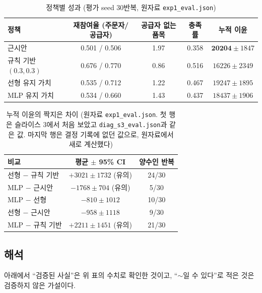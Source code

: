 \documentclass[11pt,a4paper]{article}
\begin{document}
\begin{table}[H]
\centering\small
\caption{정책별 성과 (평가 seed 30반복, 원자료 \texttt{exp1\_eval.json})}\label{tab:policy}
\begin{tabular}{lcccc}
\toprule
정책 & 재참여율 (주문자/공급자) & 공급자 없는 품목 & 충족률 & 누적 이윤\\
\midrule
근시안 & 0.501 / 0.506 & 1.97 & 0.358 & $\mathbf{20204}\pm1847$\\
규칙 기반 $(0.3,0.3)$ & 0.676 / 0.770 & 0.86 & 0.516 & $16226\pm2349$\\
선형 유지 가치 & 0.535 / 0.712 & 1.22 & 0.467 & $19247\pm1895$\\
MLP 유지 가치 & 0.534 / 0.660 & 1.43 & 0.437 & $18437\pm1906$\\
\bottomrule
\end{tabular}
\end{table}

\begin{table}[H]
\centering\small
\caption{누적 이윤의 짝지은 차이 (원자료 \texttt{exp1\_eval.json}. 첫 행은 슬라이스 3에서 처음 보았고 \texttt{diag\_s3\_eval.json}과 같은 값. 마지막 행은 결정 기록에 없던 값으로, 원자료에서 새로 계산했다)}
\begin{tabular}{lcc}
\toprule
비교 & 평균 $\pm$ 95\% CI & 양수인 반복\\
\midrule
선형 $-$ 규칙 기반 & $+3021\pm1732$ (유의) & 24/30\\
MLP $-$ 근시안 & $-1768\pm704$ (유의) & 5/30\\
MLP $-$ 선형 & $-810\pm1012$ & 10/30\\
선형 $-$ 근시안 & $-958\pm1118$ & 9/30\\
MLP $-$ 규칙 기반 & $+2211\pm1451$ (유의) & 21/30\\
\bottomrule
\end{tabular}
\end{table}

\subsection{해석}

아래에서 ``검증된 사실''은 위 표의 수치로 확인한 것이고, ``$\sim$일 수 있다''로 적은 것은 검증하지 않은 가설이다.
\end{document}
